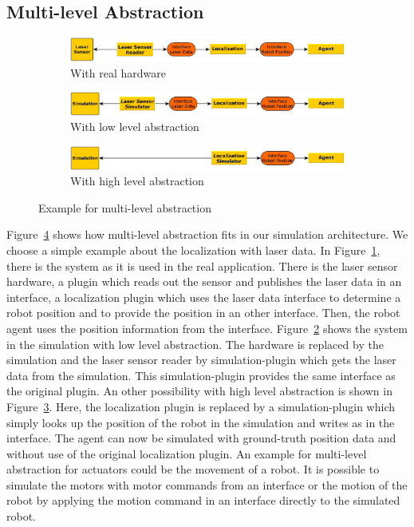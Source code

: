 \subsection{Multi-level Abstraction}
\label{sec:architecture_mla}
\begin{figure}
\centering
\begin{subfigure}[b]{\textwidth}
\includegraphics[width=\textwidth]{tabs/mla_hardware}
\caption{With real hardware}
\label{fig:mla_hardware}
\end{subfigure}
\begin{subfigure}[b]{\textwidth}
\includegraphics[width=\textwidth]{tabs/mla_sim_low}
\caption{With low level abstraction}
\label{fig:mla_sim_low}
\end{subfigure}
\begin{subfigure}[b]{\textwidth}
\includegraphics[width=\textwidth]{tabs/mla_sim_high}
\caption{With high level abstraction}
\label{fig:mla_sim_high}
\end{subfigure}
\caption{Example for multi-level abstraction}
\label{fig:mla}
\end{figure}
Figure~\ref{fig:mla} shows how multi-level abstraction fits in our simulation architecture. We choose a simple example about the localization with laser data. In Figure~\ref{fig:mla_hardware}, there is the system as it is used in the real application. There is the laser sensor hardware, a plugin which reads out the sensor and publishes the laser data in an interface, a localization plugin which uses the laser data interface to determine a robot position and to provide the position in an other interface. Then, the robot agent uses the position information from the interface. Figure~\ref{fig:mla_sim_low} shows the system in the simulation with low level abstraction. The hardware is replaced by the simulation and the laser sensor reader by simulation-plugin which gets the laser data from the simulation. This simulation-plugin provides the same interface as the original plugin. An other possibility with high level abstraction is shown in Figure~\ref{fig:mla_sim_high}. Here, the localization plugin is replaced by a simulation-plugin which simply looks up the position of the robot in the simulation and writes as in the interface. The agent can now be simulated with ground-truth position data and without use of the original localization plugin. An example for multi-level abstraction for actuators could be the movement of a robot. It is possible to simulate the motors with motor commands from an interface or the motion of the robot by applying the motion command in an interface directly to the simulated robot.
